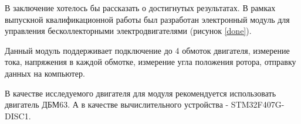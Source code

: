 \conclusion

В заключение хотелось бы рассказать о достигнутых результатах.
В рамках выпускной квалификационной работы был разработан электронный
модуль для управления бесколлекторными электродвигателями (рисунок \ref{done}).


Данный модуль поддерживает подключение до 4 обмоток двигателя, измерение тока,
напряжения в каждой обмотке, измерение угла положения ротора, отправку данных на компьютер.

В качестве исследуемого двигателя для модуля рекомендуется использовать
двигатель ДБМ63. А в качестве вычислительного устройства - STM32F407G-DISC1.